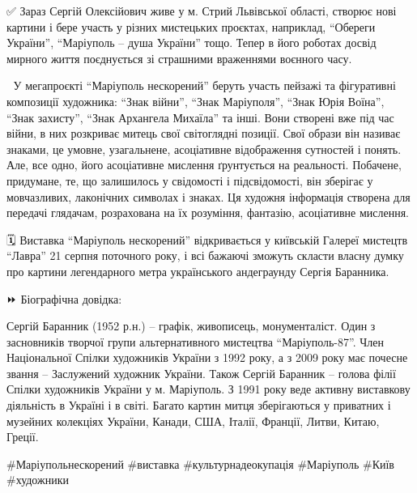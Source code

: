 ✅️ Зараз Сергій Олексійович живе у м. Стрий Львівської області, створює нові
картини і бере участь у різних мистецьких проєктах, наприклад, \enquote{Обереги
України}, \enquote{Маріуполь – душа України} тощо. Тепер в його роботах досвід мирного
життя поєднується зі страшними враженнями воєнного часу.

📍 У мегапроєкті \enquote{Маріуполь нескорений} беруть участь пейзажі та
фігуративні композиції художника: \enquote{Знак війни}, \enquote{Знак
Маріуполя}, \enquote{Знак Юрія Воїна}, \enquote{Знак захисту}, \enquote{Знак
Архангела Михаїла} та інші. Вони створені вже під час війни, в них розкриває
митець свої світоглядні позиції. Свої образи він називає знаками, це умовне,
узагальнене, асоціативне відображення сутностей і понять. Але, все одно, його
асоціативне мислення ґрунтується на реальності. Побачене, придумане, те, що
залишилось у свідомості і підсвідомості, він зберігає у мовчазливих, лаконічних
символах і знаках. Ця художня інформація створена для передачі глядачам,
розрахована на їх розуміння, фантазію, асоціативне мислення.

🗓 Виставка \enquote{Маріуполь нескорений} відкривається у київській Галереї мистецтв
\enquote{Лавра} 21 серпня поточного року, і всі бажаючі зможуть скласти власну думку
про картини легендарного метра українського андеграунду Сергія Баранника.

⏩️ Біографічна довідка:

Сергій Баранник (1952 р.н.) – графік, живописець, монументаліст. Один з
засновників творчої групи альтернативного мистецтва \enquote{Маріуполь-87}. Член
Національної Спілки художників України з 1992 року, а з 2009 року має почесне
звання – Заслужений художник України. Також Сергій Баранник – голова філії
Спілки художників України у м. Маріуполь. З 1991 року веде активну виставкову
діяльність в Україні і в світі. Багато картин митця зберігаються у приватних і
музейних колекціях України, Канади, США, Італії, Франції, Литви, Китаю, Греції.

\#Маріупольнескорений \#виставка \#культурнадеокупація \#Маріуполь \#Київ \#художники

